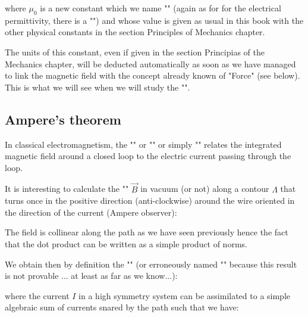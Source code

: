 	where $\mu_0$ is a new constant which we name "\label{magnetic permeability of vacuum}" (again as for for the electrical permittivity, there is a "") and whose value is given as usual in this book with the other physical constants in the section Principles of Mechanics chapter.
	
	The units of this constant, even if given in the section Principias of the Mechanics chapter, will be deducted automatically as soon as we have managed to link the magnetic field with the concept already known of "Force" (see below). This is what we will see when we will study the "".
	
	\subsection{Ampere's theorem }
	In classical electromagnetism, the "" or "" or simply "" relates the integrated magnetic field around a closed loop to the electric current passing through the loop.
	
	It is interesting to calculate the "" $\vec{B}$ in vacuum (or not) along a contour $\Lambda$ that turns once in the positive direction (anti-clockwise) around the wire oriented in the direction of the current (Ampere observer):
	
	
	\begin{tcolorbox}[title=Remark,colframe=black,arc=10pt]
	The field is collinear along the path as we have seen previously hence the fact that the dot product can be written as a simple product of norms.
	\end{tcolorbox}
	We obtain then by definition the "" (or erroneously named "" because this result is not provable ... at least as far as we know...):
	
	where the current $I$ in a high symmetry system can be assimilated to a simple algebraic sum of currents snared by the path such that we have:
	
